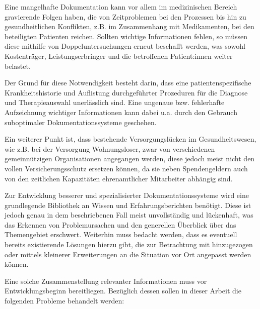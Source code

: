 Eine mangelhafte Dokumentation kann vor allem im medizinischen Bereich gravierende Folgen haben, die von Zeitproblemen bei den Prozessen bis hin zu gesundheitlichen Konflikten, z.B. im Zusammenhang mit Medikamenten, bei den beteiligten Patienten reichen. \citep{Silvestre.2017} Sollten wichtige Informationen fehlen, so müssen diese mithilfe von Doppeluntersuchungen erneut beschafft werden, was sowohl Kostenträger, Leistungserbringer und die betroffenen Patient:innen weiter belastet.

Der Grund für diese Notwendigkeit besteht darin, dass eine patientenspezifische Krankheitshistorie und Auflistung durchgeführter Prozeduren für die Diagnose und Therapieauswahl unerlässlich sind. Eine ungenaue bzw. fehlerhafte Aufzeichnung wichtiger Informationen kann dabei u.a. durch den Gebrauch suboptimaler Dokumentationssysteme geschehen. 

Ein weiterer Punkt ist, dass bestehende Versorgungslücken im Gesundheitswesen, wie z.B. bei der Versorgung Wohnungsloser, zwar von verschiedenen gemeinnützigen Organisationen angegangen werden, diese jedoch meist nicht den vollen Versicherungsschutz ersetzen können, da sie neben Spendengeldern auch von den zeitlichen Kapazitäten ehrenamtlicher Mitarbeiter abhängig sind. \citep[S. 6]{Zanders.2022}

Zur Entwicklung besserer und spezialisierter Dokumentationssysteme wird eine grundlegende Bibliothek an Wissen und Erfahrungsberichten benötigt. Diese ist jedoch genau in dem beschriebenen Fall meist unvollständig und lückenhaft, was das Erkennen von Problemursachen und den generellen Überblick über das Themengebiet erschwert. Weiterhin muss bedacht werden, dass es eventuell bereits existierende Lösungen hierzu gibt, die zur Betrachtung mit hinzugezogen oder mittels kleinerer Erweiterungen an die Situation vor Ort angepasst werden können. 

Eine solche Zusammenstellung relevanter Informationen muss vor Entwicklungsbeginn bereitliegen. Bezüglich dessen sollen in dieser Arbeit die folgenden Probleme behandelt werden:

